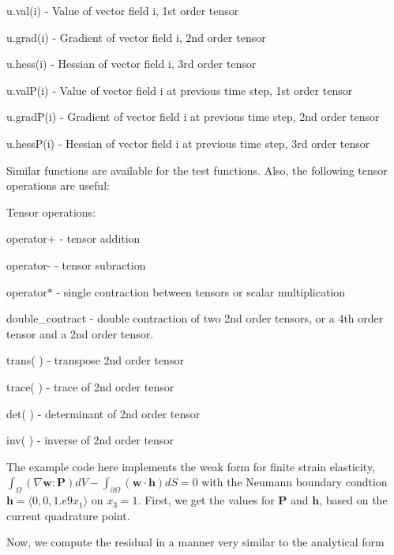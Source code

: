 {\ttfamily u.\-val(i)} -\/ Value of vector field i, 1st order tensor \par
{\ttfamily u.\-grad(i)} -\/ Gradient of vector field i, 2nd order tensor \par
{\ttfamily u.\-hess(i)} -\/ Hessian of vector field i, 3rd order tensor \par
{\ttfamily u.\-val\-P(i)} -\/ Value of vector field i at previous time step, 1st order tensor \par
{\ttfamily u.\-grad\-P(i)} -\/ Gradient of vector field i at previous time step, 2nd order tensor \par
{\ttfamily u.\-hess\-P(i)} -\/ Hessian of vector field i at previous time step, 3rd order tensor

Similar functions are available for the test functions. Also, the following tensor operations are useful\-:

Tensor operations\-: \par
{\ttfamily operator+} -\/ tensor addition \par
{\ttfamily operator-\/} -\/ tensor subraction \par
{\ttfamily operator$\ast$} -\/ single contraction between tensors or scalar multiplication \par
{\ttfamily double\-\_\-contract} -\/ double contraction of two 2nd order tensors, or a 4th order tensor and a 2nd order tensor. \par
{\ttfamily trans( )} -\/ transpose 2nd order tensor \par
{\ttfamily trace( )} -\/ trace of 2nd order tensor \par
{\ttfamily det( )} -\/ determinant of 2nd order tensor \par
{\ttfamily inv( )} -\/ inverse of 2nd order tensor \par
 The example code here implements the weak form for finite strain elasticity, $\int_\Omega (\nabla{\boldsymbol{w}}:\boldsymbol{P}) dV - \int_{\partial\Omega} (\boldsymbol{w}\cdot\boldsymbol{h}) dS = 0$ with the Neumann boundary condtion $\boldsymbol{h} = \langle 0,0,1.e9x_1\rangle$ on $x_3=1$. First, we get the values for $\boldsymbol{P}$ and $\boldsymbol{h}$, based on the current quadrature point.


\begin{DoxyCodeInclude}

\end{DoxyCodeInclude}


Now, we compute the residual in a manner very similar to the analytical form


